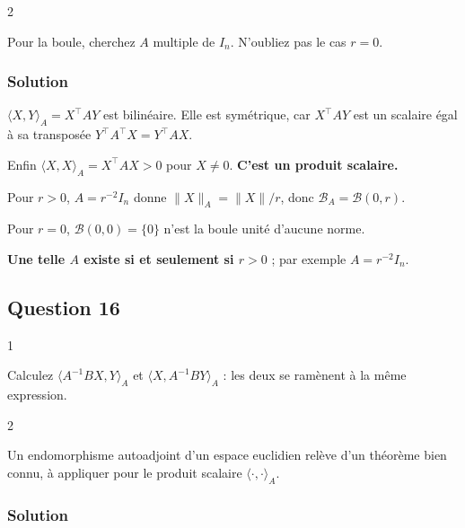 \documentclass[11pt,a4paper]{article}
\begin{document}
\begin{indication}{2}

Pour la boule, cherchez \(A\) multiple de \(I_n\). N'oubliez pas le cas \(r=0\).

\end{indication}

\hypertarget{solution-14}{%
\subsubsection{Solution}\label{solution-14}}

\(\langle X,Y\rangle_A=X^\top AY\) est bilinéaire. Elle est symétrique, car \(X^\top AY\) est un scalaire égal à sa transposée \(Y^\top A^\top X=Y^\top AX\).

Enfin \(\langle X,X\rangle_A=X^\top AX>0\) pour \(X\neq0\). \textbf{C'est un produit scalaire.}

Pour \(r>0\), \(A=r^{-2}I_n\) donne \(\|X\|_A=\|X\|/r\), donc \({\mathcal{B}}_A=\mathcal{B}(0,r)\).

Pour \(r=0\), \(\mathcal{B}(0,0)=\{0\}\) n'est la boule unité d'aucune norme.

\textbf{Une telle \(A\) existe si et seulement si \(r>0\)} ; par exemple \(A=r^{-2}I_n\).

\hypertarget{question-16}{%
\subsection{Question 16}\label{question-16}}

\begin{indication}{1}

Calculez \(\langle A^{-1}BX,Y\rangle_A\) et \(\langle X,A^{-1}BY\rangle_A\) : les deux se ramènent à la même expression.

\end{indication}

\begin{indication}{2}

Un endomorphisme autoadjoint d'un espace euclidien relève d'un théorème bien connu, à appliquer pour le produit scalaire \(\langle\cdot,\cdot\rangle_A\).

\end{indication}

\hypertarget{solution-15}{%
\subsubsection{Solution}\label{solution-15}}
\end{document}
